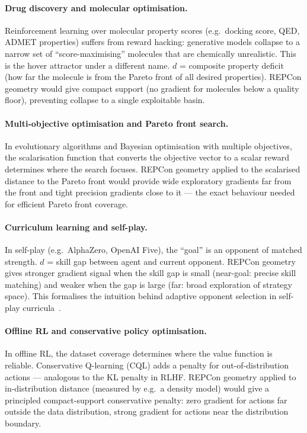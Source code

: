 \documentclass{article}
\begin{document}
\paragraph{Drug discovery and molecular optimisation.}
Reinforcement learning over molecular property scores (e.g.\ docking score, QED,
ADMET properties) suffers from reward hacking: generative models collapse to a narrow
set of ``score-maximising'' molecules that are chemically unrealistic. This is the
hover attractor under a different name. $d$ = composite property deficit (how far
the molecule is from the Pareto front of all desired properties). REPCon geometry
would give compact support (no gradient for molecules below a quality floor),
preventing collapse to a single exploitable basin.

\paragraph{Multi-objective optimisation and Pareto front search.}
In evolutionary algorithms and Bayesian optimisation with multiple objectives, the
scalarisation function that converts the objective vector to a scalar reward determines
where the search focuses. REPCon geometry applied to the scalarised distance to the
Pareto front would provide wide exploratory gradients far from the front and tight
precision gradients close to it — the exact behaviour needed for efficient Pareto
front coverage.

\paragraph{Curriculum learning and self-play.}
In self-play (e.g.\ AlphaZero, OpenAI Five), the ``goal'' is an opponent of matched
strength. $d$ = skill gap between agent and current opponent. REPCon geometry gives
stronger gradient signal when the skill gap is small (near-goal: precise skill
matching) and weaker when the gap is large (far: broad exploration of strategy space).
This formalises the intuition behind adaptive opponent selection in self-play
curricula~\citep{narvekar2020curriculum}.

\paragraph{Offline RL and conservative policy optimisation.}
In offline RL, the dataset coverage determines where the value function is reliable.
Conservative Q-learning (CQL) adds a penalty for out-of-distribution actions ---
analogous to the KL penalty in RLHF. REPCon geometry applied to in-distribution
distance (measured by e.g.\ a density model) would give a principled compact-support
conservative penalty: zero gradient for actions far outside the data distribution,
strong gradient for actions near the distribution boundary.
\end{document}

